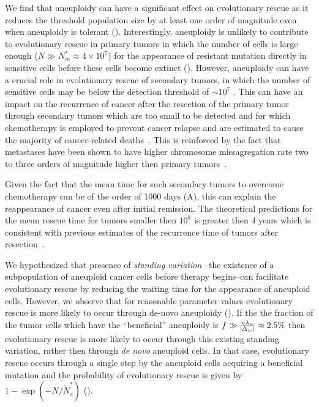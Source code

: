 \documentclass[12pt]{extarticle}
\begin{document}
We find that aneuploidy can have a significant effect on evolutionary rescue as it reduces the threshold population size by at least one order of magnitude even when aneuploidy is tolerant (). Interestingly, aneuploidy is unlikely to contribute to evolutionary rescue in primary tumors in which the number of cells is large enough ($N\gg N_m^*\approx 4\times10^7$) for the appearance of resistant mutation directly in sensitive cells before these cells become extinct ().
However, aneuploidy can have a crucial role in evolutionary rescue of secondary tumors, in which the number of sensitive cells may be below the detection threshold of $\sim10^7$  \citep{bozic2013evolutionary}. This can have an impact on the recurrence of cancer after the resection of the primary tumor  through secondary tumors which are too small to be detected and for which chemotherapy is employed to prevent  cancer relapse and are estimated to cause the majority of cancer-related deaths~\citep{chaffer2011perspective}. This is reinforced by the fact that metastases have been shown to have higher chromosome missagregation rate two to three orders of magnitude higher then primary tumors~\citep{kimmel2023intra}.

Given the fact that the mean time for such secondary tumors to overcome chemotherapy can be of the order of 1000 days (A),
this can explain the reappearance of cancer even after initial remission. The theoretical predictions for the mean rescue time for tumors smaller then  $10^8$ is greater then 4 years which is consistent with previous estimates of the recurrence time of tumors after resection~\citep{avanzini2019cancer}. 

We hypothesized that presence of \emph{standing variation} 
--the existence of a subpopulation of aneuploid cancer cells before therapy begins--can facilitate evolutionary rescue by reducing the waiting time for the appearance of aneuploid cells. However, we observe that for reasonable parameter values evolutionary rescue is more likely to occur through de-novo aneuploidy (). If the the fraction of the tumor cells which have the ``beneficial'' aneuploidy is $f\gg\frac{u\lambda_w}{\abs{\Delta_w}}\approx2.5\%$ then evolutionary rescue is more likely to occur through this existing standing variation, rather then through \emph{de novo} aneuploid cells. In that case, evolutionary rescue occurs through a single step by the aneuploid cells acquiring a beneficial mutation and the probability of evolutionary rescue is given by $1-\exp\left(-N/\tilde{N}_a^*\right)$  (). %
\end{document}
